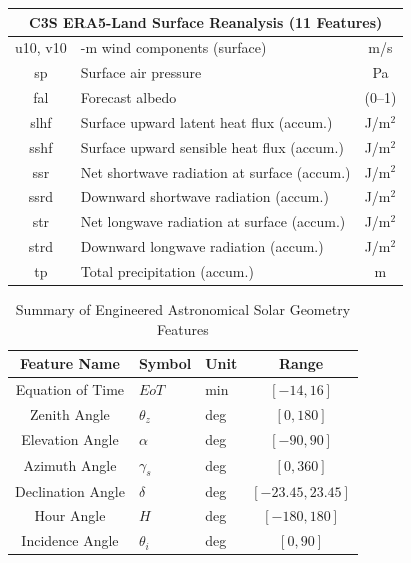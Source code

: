 \documentclass[conference]{IEEEtran}
\begin{document}
\begin{table}[htbp]
\begin{tabularx}{\columnwidth}{|c|>{\centering\arraybackslash}X|c|}
			\multicolumn{3}{|c|}{\textbf{C3S ERA5-Land Surface Reanalysis (11 Features)}} \\ \hline
			u10, v10  & 10-m wind components (surface)                       & m/s \\ \hline
			sp        & Surface air pressure                                 & Pa \\ \hline
			fal       & Forecast albedo                                      & (0--1) \\ \hline
			slhf      & Surface upward latent heat flux (accum.)             & J/m$^2$ \\ \hline
			sshf      & Surface upward sensible heat flux (accum.)           & J/m$^2$ \\ \hline
			ssr       & Net shortwave radiation at surface (accum.)          & J/m$^2$ \\ \hline
			ssrd      & Downward shortwave radiation (accum.)                & J/m$^2$ \\ \hline
			str       & Net longwave radiation at surface (accum.)           & J/m$^2$ \\ \hline
			strd      & Downward longwave radiation (accum.)                 & J/m$^2$ \\ \hline
			tp        & Total precipitation (accum.)                          & m \\ \hline
		\end{tabularx}
	\end{table}
	
	\begin{table}[htbp]
		\centering
		\caption{Summary of Engineered Astronomical Solar Geometry Features}
		\label{tab:solar_features}
		\setlength{\tabcolsep}{3pt}
		\footnotesize
		\begin{tabularx}{\columnwidth}{|c|>{\centering}X|>{\centering}X|c|}
			\hline
			\textbf{Feature Name} & \textbf{Symbol} & \textbf{Unit} & \textbf{Range} \rule{0pt}{10pt} \\ \hline
			Equation of Time      & $EoT$           & min           & $[-14, 16]$ \rule{0pt}{8pt} \\ \hline
			Zenith Angle          & $\theta_z$      & deg           & $[0, 180]$  \rule{0pt}{8pt} \\ \hline
			Elevation Angle       & $\alpha$        & deg           & $[-90, 90]$ \rule{0pt}{8pt} \\ \hline
			Azimuth Angle         & $\gamma_s$      & deg           & $[0, 360]$  \rule{0pt}{8pt} \\ \hline
			Declination Angle     & $\delta$        & deg           & $[-23.45, 23.45]$ \rule{0pt}{8pt} \\ \hline
			Hour Angle            & $H$             & deg           & $[-180, 180]$  \rule{0pt}{8pt} \\ \hline
			Incidence Angle       & $\theta_i$      & deg           & $[0, 90]$ \rule{0pt}{8pt} \\ \hline
		\end{tabularx}
	\end{table}
	
\end{document}
